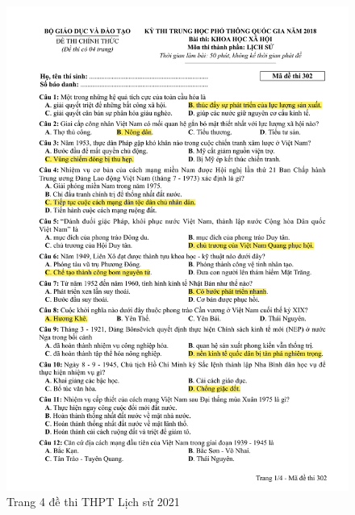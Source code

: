 \begin{figure}[htbp]
    \centering
    \includegraphics[width=1\textwidth, page=4]{Appendix/Fig/2018_302.pdf}
    \caption{Trang 4 đề thi THPT Lịch sử 2021}
\end{figure}


